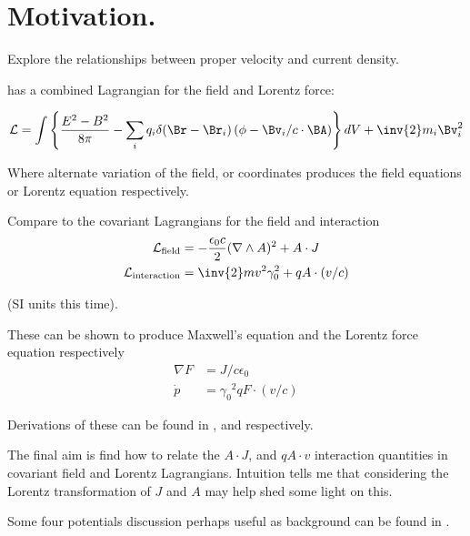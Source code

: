 \documentclass{article}
\author{Peeter Joot}
\date{ October 17, 2008.  Last Revision: $Date: 2008/10/19 15:56:59 $ }
\newcommand{\LL}[0]{\mathcal{L}}
\newcommand{\grad}[0]{\nabla}
\newcommand{\pdot}[0]{\dot{p}}
\begin{document}

\tableofcontents

\section{ Motivation.}

Explore the relationships between proper velocity and current density.

\cite{goldstein1951cm} has a combined Lagrangian for the field and Lorentz force:

\begin{align*}
\LL = \int \left\{ \frac{E^2 - B^2}{8 \pi} - \sum_i q_i \delta(\Br-\Br_i)\left(\phi - \Bv_i/c \cdot \BA\right)\right\} dV + \inv{2} m_i \Bv_i^2
\end{align*}

Where alternate variation of the field, or coordinates produces the field equations or Lorentz equation respectively.

Compare to the covariant Lagrangians for the field and interaction 
\begin{align}\label{eqn:maxlag}
\LL_{\text{field}} &= -\frac{\epsilon_0 c}{2} (\grad \wedge A)^2 + A \cdot J \\
\LL_{\text{interaction}} &= \inv{2} m v^2 \gamma_0^2 + q A \cdot (v/c)
\end{align}

(SI units this time).

These can be shown to produce Maxwell's equation and the Lorentz force equation respectively
\begin{align}
\grad F &= J/c\epsilon_0 \\
\pdot &= {\gamma_0}^2 q F \cdot (v/c)
\end{align}

Derivations of these can be found in \cite{PJFieldLagrangian}, and \cite{PJSrLorentzForce} respectively.

The final aim is 
find how to relate the $A\cdot J$, and $q A \cdot v$ interaction quantities in covariant field and
Lorentz Lagrangians.  Intuition tells me that considering the Lorentz transformation of $J$ and $A$ may help
shed some light on this.

Some four potentials discussion perhaps useful as background can be found in \cite{PJFourPotential}.

\section{ }



\end{document}
